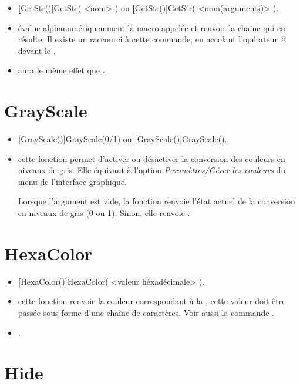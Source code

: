 \begin{itemize}
 \item \util \textbf[GetStr()]{GetStr( <nom> )} ou \textbf[GetStr()]{GetStr( <nom(arguments)> )}.
 \item \desc évalue alphanumériquemment la macro appelée  et renvoie la chaîne qui en résulte. Il existe un raccourci à cette commande, en accolant l'opérateur @ devant le .
 \item \exem {} aura le même effet que .
\end{itemize}


\section{GrayScale}\label{cmdGrayScale}

\begin{itemize}
 \item \util \textbf[GrayScale()]{GrayScale(0/1)} ou \textbf[GrayScale()]{GrayScale()}.
 \item \desc cette fonction permet d'activer ou désactiver la conversion des couleurs en niveaux de gris. Elle équivaut à l'option \textsl{Paramètres/Gérer les couleurs} du menu de l'interface graphique. 

 Lorsque l'argument est vide, la fonction renvoie l'état actuel de la conversion en niveaux de gris (0 ou 1). Sinon, elle renvoie \Nil.
\end{itemize}

\section{HexaColor}\label{cmdHexaColor}

\begin{itemize}
 \item \util \textbf[HexaColor()]{HexaColor( <valeur héxadécimale> )}.
 \item \desc cette fonction renvoie la couleur correspondant à la , cette valeur doit être passée sous forme d'une chaîne de caractères. Voir aussi la commande .
 \item \exem {}.
\end{itemize}

\section{Hide}\label{cmdHide}

